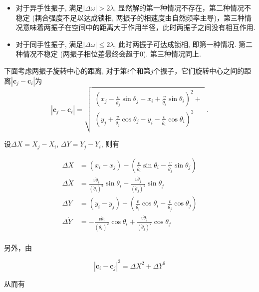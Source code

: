\documentclass{article}
\begin{document}
\begin{itemize}
    \item 对于异手性振子, 满足$\left|\Delta\omega\right|> 2\lambda$, 显然解的第一种情况不存在，第二种情况不稳定 (耦合强度不足以达成锁相, 两振子的相速度由自然频率主导)，第三种情况意味着两振子在空间中的距离大于作用半径，此时两振子之间没有相互作用.
    \item 对于同手性振子, 满足$\left|\Delta\omega\right|\leqslant 2\lambda$, 此时两振子可达成锁相, 即第一种情况. 第二种情况不稳定 (两振子相位差最终会趋于0). 第三种情况同上.
\end{itemize}

下面考虑两振子旋转中心的距离, 对于第$i$个和第$j$个振子，它们旋转中心之间的距离$\left| \mathbf{c}_j-\mathbf{c}_i \right|$为
\begin{equation}\label{eq:distanceCenter}
    \left| \mathbf{c}_j-\mathbf{c}_i \right|=\sqrt{\begin{array}{l}
        \left( x_j-\frac{v}{\dot{\theta}_j}\sin \theta _j-x_i+\frac{v}{\dot{\theta}_i}\sin \theta _i \right) ^2+\\
        \left( y_j+\frac{v}{\dot{\theta}_j}\cos \theta _j-y_i-\frac{v}{\dot{\theta}_i}\cos \theta _i \right) ^2\\
    \end{array}}\;.
\end{equation}

设$\Delta X=X_j-X_i$, $\Delta Y=Y_j-Y_i$, 则有

$$
\begin{aligned}
	\Delta X&=\left( x_i-x_j \right) -\left( \frac{v}{\dot{\theta}_i}\sin \theta _i-\frac{v}{\dot{\theta}_j}\sin \theta _j \right)\\
	\Delta \dot{X}&=\frac{v\ddot{\theta}_i}{\left( \dot{\theta}_i \right) ^2}\sin \theta _i-\frac{v\ddot{\theta}_j}{\left( \dot{\theta}_j \right) ^2}\sin \theta _j\\
	\Delta Y&=\left( y_i-y_j \right) +\left( \frac{v}{\dot{\theta}_i}\cos \theta _i-\frac{v}{\dot{\theta}_j}\cos \theta _j \right)\\
	\Delta \dot{Y}&=-\frac{v\ddot{\theta}_i}{\left( \dot{\theta}_i \right) ^2}\cos \theta _i+\frac{v\ddot{\theta}_j}{\left( \dot{\theta}_j \right) ^2}\cos \theta _j\\
\end{aligned}
$$

另外，由

$$
\left| \mathbf{c}_i-\mathbf{c}_j \right|^2=\Delta X^2+\Delta Y^2
$$

从而有
\end{document}
